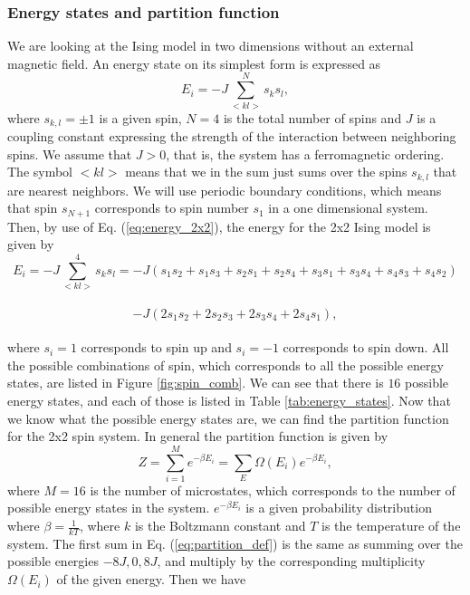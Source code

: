 \documentclass[12pt]{article}
\begin{document}
\begin{flushleft}
\subsubsection{Energy states and partition function}
We are looking at the Ising model in two dimensions without an external magnetic field. An energy state on its simplest form is expressed as
\begin{equation}\label{eq:energy_2x2}
E_i = -J\sum\limits_{<kl>}^{N}s_k s_l,
\end{equation}
where $s_{k,l} = \pm1$ is a given spin, $N=4$ is the total number of spins and $J$ is a coupling constant expressing the strength of the interaction between neighboring spins. We assume that $J>0$, that is, the system has a ferromagnetic ordering. The symbol $<kl>$ means that we in the sum just sums over the spins $s_{k,l}$ that are nearest neighbors. We will use periodic boundary conditions, which means that spin $s_{N+1}$ corresponds to spin number $s_1$ in a one dimensional system. Then, by use of Eq. (\ref{eq:energy_2x2}), the energy for the 2x2 Ising model is given by
\vspace{5mm}
$$E_i = -J\sum\limits_{<kl>}^{4}s_k s_l = -J\left(s_1s_2 + s_1s_3+s_2s_1+s_2s_4+s_3s_1+s_3s_4+s_4s_3+s_4s_2\right)$$\\
$$-J\left(2s_1s_2 + 2s_2s_3 + 2s_3s_4 + 2s_4s_1\right),$$\\
\vspace{5mm}
where $s_i = 1$ corresponds to spin up and $s_i = -1$ corresponds to spin down. All the possible combinations of spin, which corresponds to all the possible energy states, are listed in Figure \ref{fig:spin_comb}. We can see that there is $16$ possible energy states, and each of those is listed in Table \ref{tab:energy_states}. Now that we know what the possible energy states are, we can find the partition function for the 2x2 spin system. In general the partition function is given by\\
\vspace{5mm}
\begin{equation}\label{eq:partition_def}
Z = \sum\limits_{i=1}^{M}e^{-\beta E_i} = \sum\limits_E \Omega(E_i)e^{-\beta E_i},
\end{equation}
\vspace{5mm} 
\newpage
where $M = 16$ is the number of microstates, which corresponds to the number of possible energy states in the system. $e^{-\beta E_i}$ is a given probability distribution where $\beta = \frac{1}{kT}$, where $k$ is the Boltzmann constant and $T$ is the temperature of the system. The first sum in Eq. (\ref{eq:partition_def}) is the same as summing over the possible energies $-8J, 0, 8J$, and multiply by the corresponding multiplicity $\Omega(E_i)$ of the given energy. Then we have\\

\end{flushleft}
\end{document}
